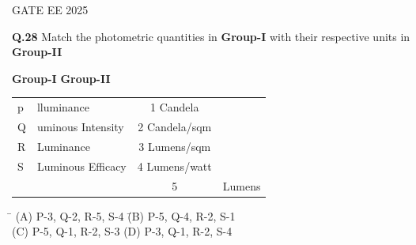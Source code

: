 \documentclass{article}
\begin{document}
GATE EE 2025
 

\noindent \textbf{Q.28} \quad Match the photometric quantities in \textbf{Group-I} with their respective units in \textbf{Group-II}

\vspace{1cm}


\hspace{3cm}  \textbf{Group-I}\hspace{8cm} \textbf{Group-II} \\
\vspace{0.15cm}
\begin{tabular}{llcl}
\vspace{0.15cm}
\hspace{2cm} p & lluminance  & \hspace{6cm} 1   Candela \\
\vspace{0.15cm}
\hspace{2cm} Q & uminous Intensity  & \hspace{6cm} 2  Candela/sqm \\ \vspace{0.15cm}
\hspace{2cm} R & Luminance & \hspace{6cm} 3  Lumens/sqm \\ \vspace{0.15cm}
\hspace{2cm} S & Luminous Efficacy & \hspace{6cm} 4  Lumens/watt \\ \vspace{0.15cm}
\vspace{0.15cm} 
  &                         &\hspace{6cm} 5 & Lumens
\end{tabular}

\vspace{0.5cm}





\begin{flushleft}
\begin{tabbing}
\hspace{5cm} \= \kill
\hspace{2cm}(A) P-3, Q-2, R-5, S-4 \hspace{4cm} \= (B) P-5, Q-4, R-2, S-1 \\
\hspace{2cm}(C) P-5, Q-1, R-2, S-3 \> (D) P-3, Q-1, R-2, S-4 \\
\end{tabbing}
\end{flushleft}
\end{document}
